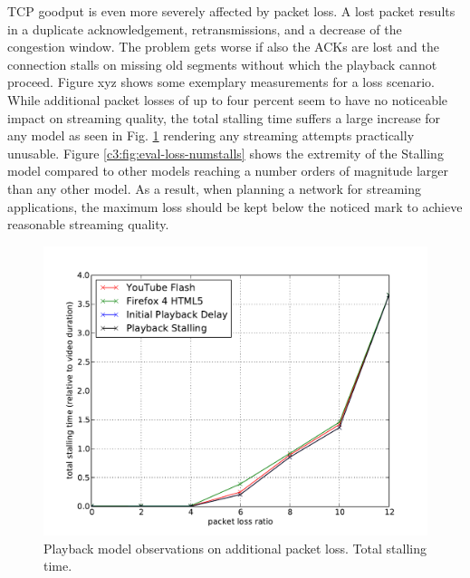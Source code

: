 TCP goodput is even more severely affected by packet loss. A lost packet results in a duplicate acknowledgement, retransmissions, and a decrease of the congestion window. The problem gets worse if also the ACKs are lost and the connection stalls on missing old segments without which the playback cannot proceed. Figure xyz shows some exemplary measurements for a loss scenario. While additional packet losses of up to four percent seem to have no noticeable impact on streaming quality, the total stalling time suffers a large increase for any model as seen in Fig. \ref{c3:fig:eval-loss-stallingtime} rendering any streaming attempts practically unusable. Figure \ref{c3:fig:eval-loss-numstalls} shows the extremity of the Stalling model compared to other models reaching a number orders of magnitude larger than any other model.
As a result, when planning a network for streaming applications, the maximum loss should be kept below the noticed mark to achieve reasonable streaming quality. 


\begin{figure}[htb]
	\centering
    \includegraphics[width=\textwidth]{images/eval-loss4mb-stallingtime.pdf}
    \caption{Playback model observations on additional packet loss. Total stalling time.}
    \label{c3:fig:eval-loss-stallingtime}
\end{figure}

